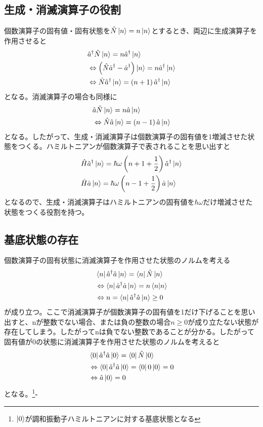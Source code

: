 \documentclass{jsarticle}  %
\numberwithin{equation}{section} %
\numberwithin{figure}{section}
\begin{document}
\subsection{生成・消滅演算子の役割}
    個数演算子の固有値・固有状態を$\hat{N}\ket{n} = n\ket{n}$とするとき、両辺に生成演算子を作用させると
    \begin{align}
        &\hat{a}^\dagger \hat{N}\ket{n} = n\hat{a}^\dagger\ket{n} \notag \\
        &\Leftrightarrow \left( \hat{N}\hat{a}^\dagger - \hat{a}^\dagger \right) \ket{n} = n\hat{a}^\dagger \ket{n} \notag \\
        &\Leftrightarrow \hat{N} \hat{a}^\dagger \ket{n} = \left( n + 1 \right) \hat{a}^\dagger \ket{n}
    \end{align}
    となる。消滅演算子の場合も同様に
    \begin{align}
        &\hat{a} \hat{N}\ket{n} = n\hat{a}\ket{n} \notag \\
        &\Leftrightarrow \hat{N}\hat{a}\ket{n} = \left( n-1 \right)\hat{a}\ket{n}
    \end{align}
    となる。したがって、生成・消滅演算子は個数演算子の固有値を1増減させた状態をつくる。ハミルトニアンが個数演算子で表されることを思い出すと
    \begin{align}
        &\hat{H}\hat{a}^\dagger \ket{n} = \hbar \omega \left( n+1 + \frac{1}{2} \right) \hat{a}^\dagger \ket{n} \notag \\
        &\hat{H}\hat{a} \ket{n} = \hbar \omega \left( n-1 + \frac{1}{2} \right) \hat{a} \ket{n}
    \end{align}
    となるので、生成・消滅演算子はハミルトニアンの固有値を$\hbar \omega $だけ増減させた状態をつくる役割を持つ。
\subsection{基底状態の存在}
    個数演算子の固有状態に消滅演算子を作用させた状態のノルムを考える
    \begin{align}
        &\bra{n}\hat{a}^\dagger \hat{a} \ket{n} = \bra{n}\hat{N}\ket{n} \notag \\
        &\Leftrightarrow \bra{n}\hat{a}^\dagger \hat{a} \ket{n} = n\braket{n|n} \notag \\ 
        &\Leftrightarrow n = \bra{n}\hat{a}^\dagger \hat{a} \ket{n} \ge0
    \end{align}
    が成り立つ。ここで消滅演算子が個数演算子の固有値を1だけ下げることを思い出すと、nが整数でない場合、または負の整数の場合$n \ge 0$が成り立たない状態が存在してしまう。したがってnは負でない整数であることが分かる。したがって固有値が0の状態に消滅演算子を作用させた状態のノルムを考えると
    \begin{align}
        &\bra{0}\hat{a}^\dagger \hat{a}\ket{0} = \bra{0}\hat{N}\ket{0} \notag \\
        &\Leftrightarrow \bra{0}\hat{a}^\dagger \hat{a}\ket{0} = \bra{0}0\ket{0} = 0 \notag \\
        &\Leftrightarrow \hat{a}\ket{0} = 0
    \end{align}
    となる。\footnote{$\ket{0}$が調和振動子ハミルトニアンに対する基底状態となる}$\square$
\end{document}
